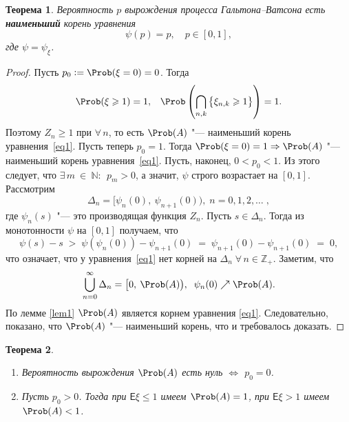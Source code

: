 \documentclass[a4paper]{article}
\newcommand{\Expect}{\mathsf{E}}
\theoremstyle{plain}
\newtheorem{thm}{Теорема}[section]
\theoremstyle{definition}
\theoremstyle{remark}
\theoremstyle{nonumberplain}
\newtheorem{proof}{Доказательство}
\theoremstyle{nonumberplain}
\begin{document}
\begin{thm}
  Вероятность $p$ вырождения процесса Гальтона--Ватсона есть \textbf{наименьший} корень уравнения
  \begin{equation}
    \label{eq1}
    \psi(p) = p, \quad p \in [0, 1]{,}
  \end{equation}
  где $\psi = \psi_{\xi}$.
\end{thm}

\begin{proof}
  Пусть $p_{0} := \Prob(\xi = 0) = 0$. Тогда
  \begin{equation*}
    \Prob(\xi \geqslant 1) = 1{,}\quad \Prob\left(\bigcap_{n,k} \left\lbrace \xi_{n,k} \geqslant 1 \right\rbrace \right) = 1{.}
  \end{equation*}
  Поэтому $Z_{n} \geqslant 1$ при $\forall\, n$, то есть $\Prob(A)$ "--- наименьший корень уравнения~\eqref{eq1}.
  Пусть теперь $p_{0} = 1$. Тогда $\Prob(\xi = 0)=1 \Rightarrow \Prob(A)$ "--- наименьший корень уравнения~\eqref{eq1}.
  Пусть, наконец, $0 < p_{0} < 1$. Из этого следует, что $\exists\, m~\in~\mathbb{N}{:}\;\, p_{m} > 0$, а значит, $\psi$ строго возрастает на $[0, 1]$. Рассмотрим
  \begin{equation*}
    \Delta_{n} = \big[\psi_{n}(0),\: \psi_{n+1}\left(0\right)\big){,}\; n = 0, 1, 2, \ldots \; {,} %
  \end{equation*}
  где $\psi_{n}(s)$ "--- это производящая функция $Z_{n}$. Пусть $s \in \Delta_{n}$. Тогда из монотонности $\psi$ на $[0, 1]$ получаем, что
  \begin{equation*}
    \psi(s) - s \; > \; \psi(\psi_{n}(0)) - \psi_{n+1}(0) \; = \; \psi_{n+1}(0) - \psi_{n+1}(0) \; = \; 0{,}
  \end{equation*}
  что означает, что у уравнения~\eqref{eq1} нет корней на $\Delta_{n} \; \forall\, n \in \mathbb{Z_{+}}$.
  Заметим, что
  \begin{equation*}
    \bigcup_{n=0}^{\infty} \Delta_{n} = \big[0,\: \Prob(A)\big), \; \; \psi_{n}(0) \nearrow \Prob(A){.} %
  \end{equation*}
  По лемме \ref{lem1} $\Prob(A)$ является корнем уравнения \eqref{eq1}. Следовательно, показано, что $\Prob(A)$ "--- наименьший корень, что и требовалось доказать.
\end{proof}

\begin{thm} \mbox{}
 \begin{enumerate}
   \item\label{firth} Вероятность вырождения $\Prob(A)$ есть нуль $\Longleftrightarrow$ $p_{0} = 0$.
   \item\label{secth} Пусть $p_{0} > 0$. Тогда при $\Expect \xi \leqslant 1$ имеем $\Prob (A) = 1$, при $\Expect \xi > 1$ имеем $\Prob(A) < 1$.
 \end{enumerate}
\end{thm}
\end{document}
